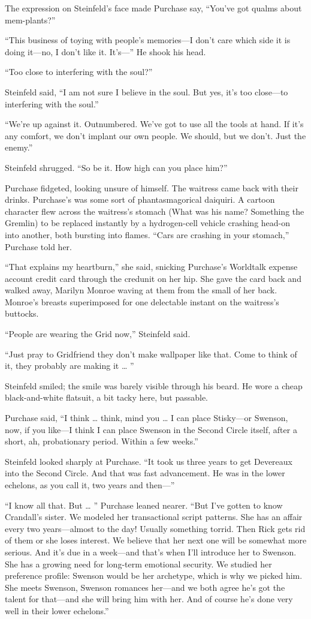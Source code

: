 The expression on Steinfeld’s face made Purchase say, “You’ve got qualms about mem-plants?”

“This business of toying with people’s memories—I don’t care which side it is doing it—no, I don’t like it. It’s—” He shook his head.

“Too close to interfering with the soul?”

Steinfeld said, “I am not sure I believe in the soul. But yes, it’s too close—to interfering with the soul.”

“We’re up against it. Outnumbered. We’ve got to use all the tools at hand. If it’s any comfort, we don’t implant our own people. We should, but we don’t. Just the enemy.”

Steinfeld shrugged. “So be it. How high can you place him?”

Purchase fidgeted, looking unsure of himself. The waitress came back with their drinks. Purchase’s was some sort of phantasmagorical daiquiri. A cartoon character flew across the waitress’s stomach (What was his name? Something the Gremlin) to be replaced instantly by a hydrogen-cell vehicle crashing head-on into another, both bursting into flames. “Cars are crashing in your stomach,” Purchase told her.

“That explains my heartburn,” she said, snicking Purchase’s Worldtalk expense account credit card through the credunit on her hip. She gave the card back and walked away, Marilyn Monroe waving at them from the small of her back. Monroe’s breasts superimposed for one delectable instant on the waitress’s buttocks.

“People are wearing the Grid now,” Steinfeld said.

“Just pray to Gridfriend they don’t make wallpaper like that. Come to think of it, they probably are making it … ”

Steinfeld smiled; the smile was barely visible through his beard. He wore a cheap black-and-white flatsuit, a bit tacky here, but passable.

Purchase said, “I think … think, mind you … I can place Stisky—or Swenson, now, if you like—I think I can place Swenson in the Second Circle itself, after a short, ah, probationary period. Within a few weeks.”

Steinfeld looked sharply at Purchase. “It took us three years to get Devereaux into the Second Circle. And that was fast advancement. He was in the lower echelons, as you call it, two years and then—”

“I know all that. But … ” Purchase leaned nearer. “But I’ve gotten to know Crandall’s sister. We modeled her transactional script patterns. She has an affair every two years—almost to the day! Usually something torrid. Then Rick gets rid of them or she loses interest. We believe that her next one will be somewhat more serious. And it’s due in a week—and that’s when I’ll introduce her to Swenson. She has a growing need for long-term emotional security. We studied her preference profile: Swenson would be her archetype, which is why we picked him. She meets Swenson, Swenson romances her—and we both agree he’s got the talent for that—and she will bring him with her. And of course he’s done very well in their lower echelons.”

